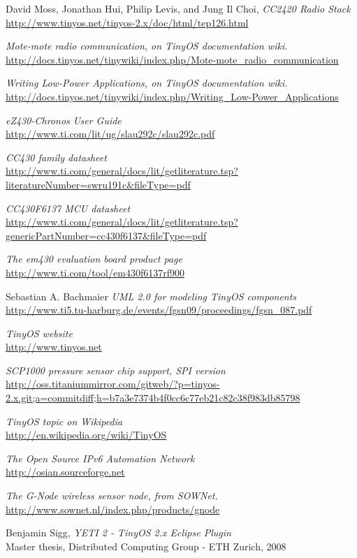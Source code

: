 \begin{thebibliography}{99}
  David Moss, Jonathan Hui, Philip Levis, and Jung Il Choi,
  \textit{CC2420 Radio Stack} \\
  \url{http://www.tinyos.net/tinyos-2.x/doc/html/tep126.html}

  \textit{Mote-mote radio communication, on TinyOS documentation wiki.} \\
  \url{http://docs.tinyos.net/tinywiki/index.php/Mote-mote_radio_communication}

  \textit{Writing Low-Power Applications, on TinyOS documentation wiki.} \\
  \url{http://docs.tinyos.net/tinywiki/index.php/Writing_Low-Power_Applications}

  \textit{eZ430-Chronos User Guide} \\
  \url{http://www.ti.com/lit/ug/slau292c/slau292c.pdf}

  \textit{CC430 family datasheet}\\
  \url{http://www.ti.com/general/docs/lit/getliterature.tsp?literatureNumber=swru191c&fileType=pdf}

  \textit{CC430F6137 MCU datasheet} \\
  \url{http://www.ti.com/general/docs/lit/getliterature.tsp?genericPartNumber=cc430f6137&fileType=pdf}

  \textit{The em430 evaluation board product page} \\
  \url{http://www.ti.com/tool/em430f6137rf900}

  Sebastian A. Bachmaier
  \textit{UML 2.0 for modeling TinyOS components} \\
  \url{http://www.ti5.tu-harburg.de/events/fgsn09/proceedings/fgsn_087.pdf}

  \textit{TinyOS website} \\
  \url{http://www.tinyos.net}

  \textit{SCP1000 pressure sensor chip support, SPI version} \\
  \url{http://oss.titaniummirror.com/gitweb/?p=tinyos-2.x.git;a=commitdiff;h=b7a3e7374b4f0cc6c77eb21c82c38f983db85798}

  \textit{TinyOS topic on Wikipedia} \\
  \url{http://en.wikipedia.org/wiki/TinyOS}

  \textit{The Open Source IPv6 Automation Network} \\
  \url{http://osian.sourceforge.net}

  \textit{The G-Node wireless sensor node, from SOWNet.} \\
  \url{http://www.sownet.nl/index.php/products/gnode}

  Benjamin Sigg, \textit{YETI 2 - TinyOS 2.x Eclipse Plugin} \\
  Master thesis, Distributed Computing Group - ETH Zurich, 2008

\end{thebibliography}
